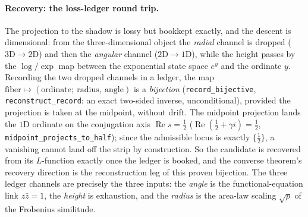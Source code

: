 \documentclass[11pt]{article}
\theoremstyle{definition}
\renewcommand{\Re}{\operatorname{Re}}
\begin{document}
\paragraph{Recovery: the loss-ledger round trip.} The projection to the shadow is lossy but bookkept
exactly, and the descent is dimensional: from the three-dimensional object the \emph{radial} channel is
dropped ($3\mathrm D\!\to\!2\mathrm D$) and then the \emph{angular} channel ($2\mathrm D\!\to\!1\mathrm D$),
while the height passes by the $\log/\exp$ map between the exponential state space $e^{y}$ and the
ordinate $y$. Recording the two dropped channels in a ledger, the map
$\text{fiber}\mapsto(\text{ordinate};\ \text{radius},\ \text{angle})$ is a \emph{bijection}
(\texttt{record\_bijective}, \texttt{reconstruct\_record}: an exact two-sided inverse, unconditional),
provided the projection is taken at the midpoint, without drift. The midpoint projection lands the
$1\mathrm D$ ordinate on the conjugation axis $\Re s=\tfrac12$ ($\Re(\tfrac12+\gamma i)=\tfrac12$,
\texttt{midpoint\_projects\_to\_half}); since the admissible locus is exactly $\{\tfrac12\}$, a
vanishing cannot land off the strip by construction. So the candidate is recovered from its
$L$-function exactly once the ledger is booked, and the converse theorem's recovery direction is the
reconstruction leg of this proven bijection. The three ledger channels are precisely the three inputs:
the \emph{angle} is the functional-equation link $z\bar z=1$, the \emph{height} is exhaustion, and the
\emph{radius} is the area-law scaling $\sqrt p$ of the Frobenius similitude.
\end{document}
